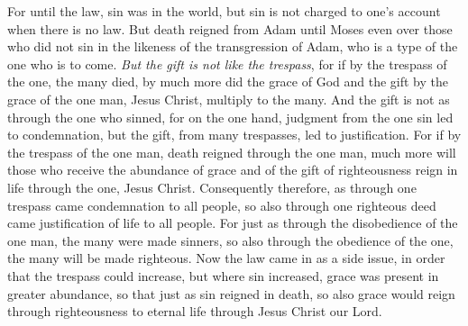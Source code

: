 \begin{biblechapter}
\verse For until the law, sin was in the world, but sin is not charged to one’s account when there is no law.
\verse But death reigned from Adam until Moses even over those who did not sin in the likeness of the transgression of Adam, who is a type of the one who is to come.
\verse \textit{But the gift is not like the trespass}, for if by the trespass of the one, the many died, by much more did the grace of God and the gift by the grace of the one man, Jesus Christ, multiply to the many.
\verse And the gift is not as through the one who sinned, for on the one hand, judgment from the one sin led to condemnation, but the gift, from many trespasses, led to justification.
\verse For if by the trespass of the one man, death reigned through the one man, much more will those who receive the abundance of grace and of the gift of righteousness reign in life through the one, Jesus Christ.
\verse Consequently therefore, as through one trespass came condemnation to all people, so also through one righteous deed came justification of life to all people.
\verse For just as through the disobedience of the one man, the many were made sinners, so also through the obedience of the one, the many will be made righteous.
\verse Now the law came in as a side issue, in order that the trespass could increase, but where sin increased, grace was present in greater abundance,
\verse so that just as sin reigned in death, so also grace would reign through righteousness to eternal life through Jesus Christ our Lord.
\end{biblechapter}

